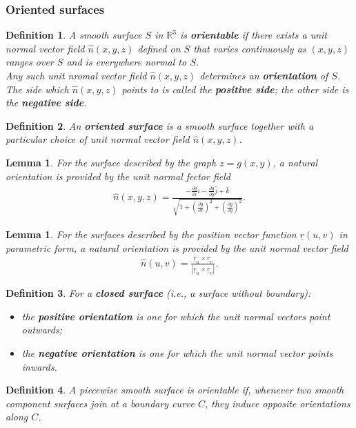 \documentclass{article}
\theoremstyle{sltheorem}
\newtheorem{definition}{Definition}[section]
\newtheorem{lemma}[theorem]{Lemma}
\newcommand{\R}{\mathbb{R}}
\newcommand{\ih}{\widehat i}
\newcommand{\jh}{\widehat j}
\newcommand{\kh}{\widehat k}
\renewcommand{\vec}{\underline}
\newcommand*\B[1]{\textbf{#1}}
\begin{document}
\subsubsection{Oriented surfaces}
\begin{definition}
    A smooth surface $S$ in $\R^3$ is \B{orientable} if there exists a unit normal vector
    field $\hat n(x,y,z)$ defined on $S$ that varies continuously as $(x,y,z)$ ranges over $S$
    and is everywhere normal to $S$.\\
    Any such unit nromal vector field $\hat n(x,y,z)$ determines an \B{orientation} of $S$.
    The side which $\hat n(x,y,z)$ points to is called the \B{positive side}; the other side is the
    \B{negative side}.
\end{definition}
\begin{definition}
    An \B{oriented surface} is a smooth surface together with a particular choice of unit
    normal vector field $\hat n(x,y,z)$.
\end{definition}
\begin{lemma}
    For the surface described by the graph $z=g(x,y)$, a natural orientation is provided by
    the unit normal fector field
    \begin{align*}
        \hat n(x,y,z)=\frac{-\frac{\partial g}{\partial x}\ih -\frac{\partial g}{\partial y}\jh + \kh}{\sqrt{1+\left(\frac{\partial g}{\partial x}\right)^2 + \left(\frac{\partial g}{\partial y}\right)^2}}.
    \end{align*}
\end{lemma}
\begin{lemma}
    For the surfaces described by the position vector function $\vec r(u,v)$ in parametric form,
    a natural orientation is provided by the unit normal vector field
    \begin{align*}
        \hat n(u,v) = \frac{\vec r_u \times \vec r_v}{|\vec r_u \times \vec r_v|}.
    \end{align*}
\end{lemma}
\begin{definition}
    For a \B{closed surface} (i.e., a surface without boundary):
    \begin{itemize}
        \item the \B{positive orientation} is one for which the unit normal vectors point outwards;
        \item the \B{negative orientation} is one for which the unit normal vector points inwards.
    \end{itemize}
\end{definition}
\begin{definition}
    A piecewise smooth surface is orientable if, whenever two smooth component surfaces join
    at a boundary curve $C$, they induce opposite orientations along $C$.
\end{definition}
\end{document}
